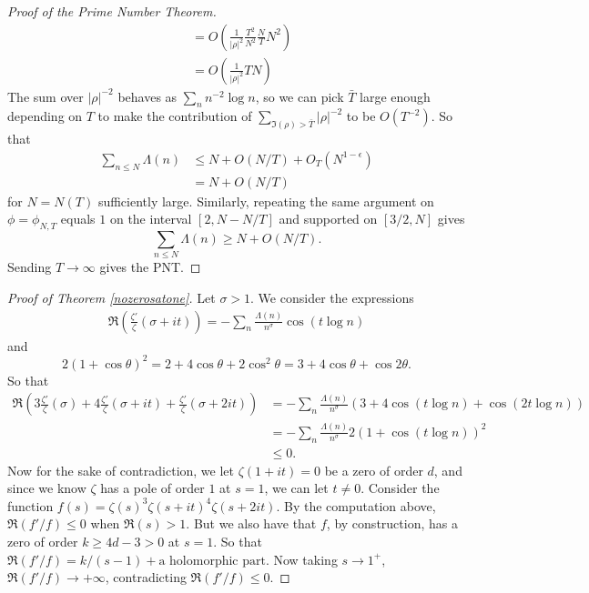\begin{proof}[Proof of the Prime Number Theorem]
\begin{align*}
    &= O\left(\frac{1}{|\rho|^2} \frac{T^2}{N^2} \frac{N}{T} N^2\right)\\
    &=O\left(\frac{1}{|\rho|^2} TN\right)
\end{align*}
The sum over $|\rho|^{-2}$ behaves as $\sum_n n^{-2} \log n$, so we can pick $\bar{T}$ large enough depending on $T$
to make the contribution of $\sum_{\Im(\rho)>\bar{T}} |\rho|^{-2}$ to be $O(T^{-2})$.
So that 
\begin{align*}
    \sum_{n\leq N}\Lambda(n)&\leq N +O(N/T)+ O_T(N^{1-\epsilon})\\
   & = N+O(N/T)
\end{align*}
for $N=N(T)$ sufficiently large.
Similarly, repeating the same argument on $\phi=\phi_{N,T}$ equals $1$ on the interval $[2,N-N/T]$ and supported on $[3/2, N]$
gives \[
    \sum_{n\leq N}\Lambda(n)\geq N+O(N/T).
\]
Sending $T\to\infty$ gives the PNT.
\end{proof}

\begin{proof}[Proof of Theorem \ref{nozerosatone}]
    Let $\sigma > 1$. We consider the expressions \begin{align*}
        \Re\left(\frac{\zeta'}{\zeta}(\sigma+it)\right) = -\sum_{n} \frac{\Lambda(n)}{n^\sigma}\cos (t\log n) 
    \end{align*}
    and \[
    2(1+\cos \theta)^2 =2+4\cos \theta + 2\cos^2 \theta = 3+4\cos\theta + \cos 2\theta.
    \]
    So that \begin{align*}
        \Re\left(3\frac{\zeta'}{\zeta}(\sigma)+ 4\frac{\zeta'}{\zeta}(\sigma+it) +\frac{\zeta'}{\zeta}(\sigma+2it)\right)
        &= -\sum_{n} \frac{\Lambda(n)}{n^\sigma}(3+4\cos (t\log n)+\cos (2t\log n))\\
        &= -\sum_{n} \frac{\Lambda(n)}{n^\sigma} 2(1+\cos( t\log n))^2\\
        &\leq 0.
    \end{align*}
    Now for the sake of contradiction, we let $\zeta(1+it)=0$ be a zero of order $d$, and since we know $\zeta$ has a pole of order $1$ at $s=1$, we can let $t\neq 0$. 
    Consider the function $f(s)=\zeta(s)^3\zeta(s+it)^4\zeta(s+2it)$.
    By the computation above, $\Re(f'/f)\leq 0$ when $\Re(s)> 1$.
    But we also have that $f$, by construction, has a zero of order $k\geq 4d-3>0$ at $s=1$.
    So that $\Re(f'/f) = k/(s-1)+ \textrm{a holomorphic part}$. Now taking $s\to 1^{+}$, $\Re(f'/f)\to +\infty$, contradicting $\Re(f'/f)\leq 0$.
\end{proof}
